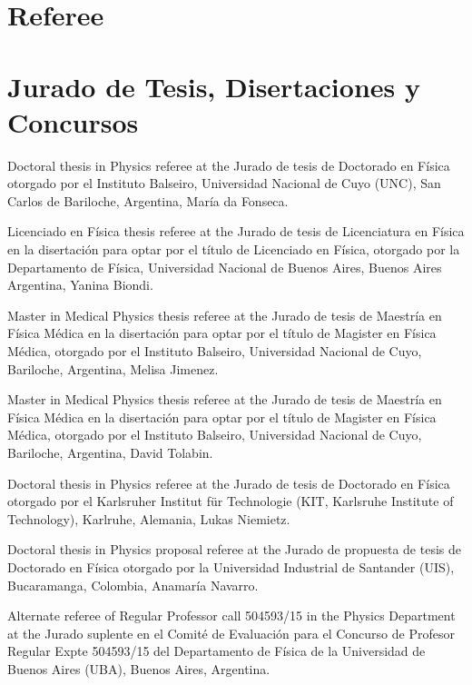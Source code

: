 

\ifeng
  \section*{Referee}
\else
  \section*{Jurado de Tesis, Disertaciones y Concursos}
\fi

\ifeng
Doctoral thesis in Physics referee at the 
\else
Jurado de tesis de Doctorado en Física otorgado por el
\fi
Instituto Balseiro, Universidad Nacional de Cuyo (UNC), San Carlos de Bariloche, Argentina, María da Fonseca.

\ifeng
Licenciado en Física thesis referee at the
\else
Jurado de tesis de Licenciatura en Física en la disertación para optar por el título de Licenciado en Física, otorgado por la 
\fi
Departamento de Física, Universidad Nacional de Buenos Aires, Buenos Aires Argentina, Yanina Biondi.

\ifeng
Master in Medical Physics thesis referee at the
\else
Jurado de tesis de Maestría en Física Médica en la disertación para optar por el título de Magister en Física Médica, otorgado por el 
\fi
Instituto Balseiro, Universidad Nacional de Cuyo, Bariloche, Argentina, Melisa Jimenez.

\ifeng
Master in Medical Physics thesis referee at the
\else
Jurado de tesis de Maestría en Física Médica en la disertación para optar por el título de Magister en Física Médica, otorgado por el 
\fi
Instituto Balseiro, Universidad Nacional de Cuyo, Bariloche, Argentina, David Tolabin.

\ifeng
Doctoral thesis in Physics referee at the 
\else
Jurado de tesis de Doctorado en Física otorgado por el 
\fi
Karlsruher Institut für Technologie (KIT, Karlsruhe Institute of Technology), Karlruhe, Alemania, Lukas Niemietz. 

\ifeng
Doctoral thesis in Physics proposal referee at the 
\else
Jurado de propuesta de tesis de Doctorado en Física otorgado por la 
\fi
Universidad Industrial de Santander (UIS), Bucaramanga, Colombia, Anamaría Navarro.

\ifeng
Alternate referee of Regular Professor call 504593/15 in the Physics Department at the  
\else
Jurado suplente en el Comité de Evaluación para el Concurso de Profesor Regular Expte 504593/15 del Departamento de Física de la 
\fi
Universidad de Buenos Aires (UBA), Buenos Aires, Argentina.

